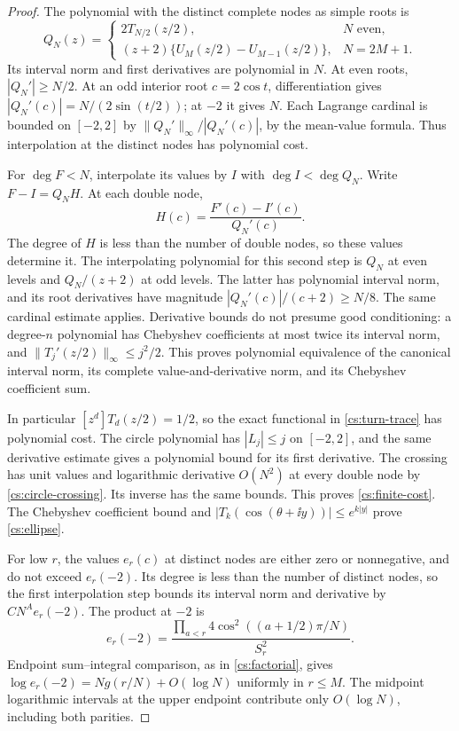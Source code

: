 \begin{proof}
The polynomial with the distinct complete nodes as simple roots is
\[
 Q_N(z)=\begin{cases}
 2T_{N/2}(z/2),&N\text{ even},\\
 (z+2)\{U_M(z/2)-U_{M-1}(z/2)\},&N=2M+1.
 \end{cases}
\]
Its interval norm and first derivatives are polynomial in \(N\).
At even roots, \(|Q_N'|\ge N/2\). At an odd interior root
\(c=2\cos t\), differentiation gives
\(|Q_N'(c)|=N/(2\sin(t/2))\); at \(-2\) it gives \(N\).
Each Lagrange cardinal is bounded on \([-2,2]\) by
\(\|Q_N'\|_\infty/|Q_N'(c)|\), by the mean-value formula.
Thus interpolation at the distinct nodes has polynomial cost.

For \(\deg F<N\), interpolate its values by \(I\) with
\(\deg I<\deg Q_N\). Write \(F-I=Q_N H\). At each double node,
\[
 H(c)=\frac{F'(c)-I'(c)}{Q_N'(c)}.
\]
The degree of \(H\) is less than the number of double nodes, so these
values determine it. The interpolating polynomial for this second
step is \(Q_N\) at even levels and \(Q_N/(z+2)\) at odd levels.
The latter has polynomial interval norm, and its root derivatives
have magnitude \(|Q_N'(c)|/(c+2)\ge N/8\). The same cardinal
estimate applies. Derivative bounds do not presume good conditioning:
a degree-\(n\) polynomial has Chebyshev coefficients at most twice its
interval norm, and \(\|T_j'(z/2)\|_\infty\le j^2/2\).
This proves polynomial equivalence of the canonical interval norm,
its complete value-and-derivative norm, and its Chebyshev coefficient sum.

In particular \([z^d]T_d(z/2)=1/2\), so the exact functional in
\eqref{cs:turn-trace} has polynomial cost. The circle polynomial has
\(|L_j|\le j\) on \([-2,2]\), and the same derivative estimate gives
a polynomial bound for its first derivative. The crossing has unit
values and logarithmic derivative \(O(N^2)\) at every double node
by \eqref{cs:circle-crossing}. Its inverse has the same bounds.
This proves \eqref{cs:finite-cost}. The Chebyshev coefficient bound
and \(|T_k(\cos(\theta+\ii y))|\le e^{k|y|}\) prove
\eqref{cs:ellipse}.

For low \(r\), the values \(e_r(c)\) at distinct nodes are either
zero or nonnegative, and do not exceed \(e_r(-2)\). Its degree is
less than the number of distinct nodes, so the first interpolation
step bounds its interval norm and derivative by \(CN^A e_r(-2)\).
The product at \(-2\) is
\[
 e_r(-2)=\frac{\prod_{a<r}4\cos^2((a+1/2)\pi/N)}{S_r^2}.
\]
Endpoint sum--integral comparison, as in \eqref{cs:factorial}, gives
\(\log e_r(-2)=Ng(r/N)+O(\log N)\) uniformly in \(r\le M\).
The midpoint logarithmic intervals at the upper endpoint contribute
only \(O(\log N)\), including both parities.


\end{proof}
